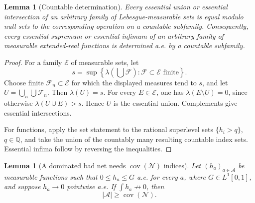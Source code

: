 \documentclass[11pt]{article}
\newtheorem{lemma}[theorem]{Lemma}
\theoremstyle{remark}
\newcommand{\covN}{\operatorname{cov}(\mathcal N)}
\begin{document}
\begin{lemma}[Countable determination]
\label{lem:countable}
Every essential union or essential intersection of an arbitrary family of
Lebesgue-measurable sets is equal modulo null sets to the corresponding
operation on a countable subfamily.  Consequently, every essential supremum
or essential infimum of an arbitrary family of measurable extended-real
functions is determined a.e. by a countable subfamily.
\end{lemma}

\begin{proof}
For a family \(\mathcal E\) of measurable sets, let
\[
 s=\sup\left\{\lambda\left(\bigcup\mathcal F\right):
                \mathcal F\subset\mathcal E\text{ finite}\right\}.
\]
Choose finite \(\mathcal F_n\subset\mathcal E\) for which the displayed
measures tend to \(s\), and let
\(U=\bigcup_n\bigcup\mathcal F_n\).  Then \(\lambda(U)=s\).  For every
\(E\in\mathcal E\), one has \(\lambda(E\setminus U)=0\), since otherwise
\(\lambda(U\cup E)>s\).  Hence \(U\) is the essential union.  Complements
give essential intersections.

For functions, apply the set statement to the rational superlevel sets
\(\{h_i>q\}\), \(q\in\mathbb Q\), and take the union of the countably many
resulting countable index sets.  Essential infima follow by reversing the
inequalities.
\end{proof}

\begin{lemma}[A dominated bad net needs \(\covN\) indices]
\label{lem:dominated}
Let \((h_a)_{a\in\mathcal A}\) be measurable functions such that
\(0\le h_a\le G\) a.e. for every \(a\), where \(G\in L^1[0,1]\), and suppose
\(h_a\to0\) pointwise a.e.  If \(\int h_a\not\to0\), then
\[
          |\mathcal A|\ge\covN.
\]
\end{lemma}
\end{document}
